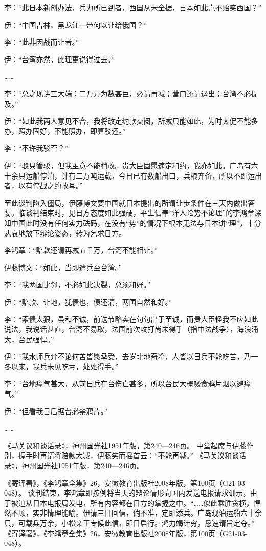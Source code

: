 \documentclass[12pt,UTF8]{ctexbook}
\begin{document}
李：“此日本新创办法，兵力所已到者，西国从未全据，日本如此岂不贻笑西国？”

伊：“中国吉林、黑龙江一带何以让给俄国？”

李：“此非因战而让者。”

伊：“台湾亦然，此理更说得过去。”

……

李：“总之现讲三大端：二万万为数甚巨，必请再减；营口还请退出；台湾不必提及。”

伊：“如此我两人意见不合，我将改定约款交阅，所减只能如此，为时太促不能多办，照办固好，不能照办，即算驳还。”

李：“不许我驳否？”

伊：“驳只管驳，但我主意不能稍改。贵大臣固愿速定和约，我亦如此。广岛有六十余只运船停泊，计有二万吨运载，今日已有数船出口，兵粮齐备，所以不即运出者，以有停战之约故耳。”

至此谈判陷入僵局，伊藤博文要中国就日本提出的所谓让步条件在三天内做出答复。临谈判结束时，见日方态度如此强硬，平生信奉“洋人论势不论理”的李鸿章深知中国此时没有任何实力砝码，在没有“势”的情况下根本无法与日本讲“理”，十分悲哀地放下辩论姿态，转为乞求日方。

李鸿章：“赔款还请再减五千万，台湾不能相让。”

伊藤博文：“如此，当即遣兵至台湾。”

李：“我两国比邻，不必如此决裂，总须和好。”

伊：“赔款、让地，犹债也，债还清，两国自然和好。”

李：“索债太狠，虽和不诚，前送节略实在句句出于至诚，而贵大臣怪我不应如此说法，我说话甚直，台湾不易取，法国前次攻打尚未得手（指中法战争），海浪涌大，台民强悍。”

伊：“我水师兵弁不论何苦皆愿承受，去岁北地奇冷，人皆以日兵不能吃苦，乃一冬以来，我兵未见吃亏，处处得手。”

李：“台地瘴气甚大，从前日兵在台伤亡甚多，所以台民大概吸食鸦片烟以避瘴气。”

伊：“但看我日后据台必禁鸦片。”

……

《马关议和谈话录》，神州国光社1951年版，第240—246页。
中堂起席与伊藤作别，握手时再请将赔款大减，伊藤笑而摇首云：“不能再减。” 《马关议和谈话录》，神州国光社1951年版，第240—246页。

《寄译署》，《李鸿章全集》26，安徽教育出版社2008年版，第100页（G21-03-048）。
谈判结束，李鸿章即按例将当天的辩论情形向国内发送电报请求训示，由于被迫从日本电报局发电，所有内容都在日方的掌握之中。“……似此乘胜贪横，悍然不顾，实非情理能喻。伊请三日回信，倘不准，定即添兵。广岛现泊运船六十余只，可载兵万余，小松亲王专候此信，即日启行。鸿力竭计穷，恳速请旨定夺。” 《寄译署》，《李鸿章全集》26，安徽教育出版社2008年版，第100页（G21-03-048）。
\end{document}

